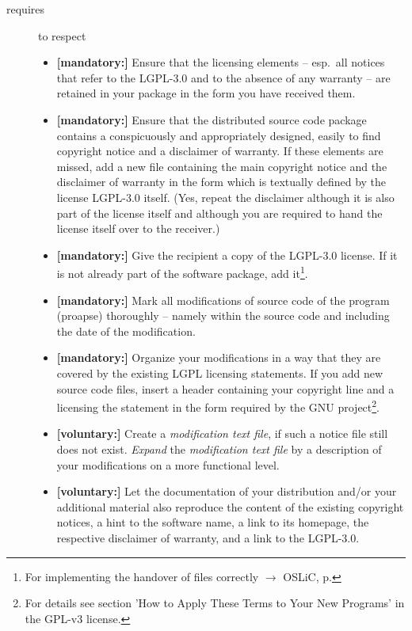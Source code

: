 \begin{description}
\item[requires] to respect
\begin{itemize}
  
  \item \textbf{[mandatory:]} Ensure that the licensing elements -- esp.\ all
  notices that refer to the LGPL-3.0 and to the absence of any
  warranty -- are retained in your package in the form you have received them.

  \item \textbf{[mandatory:]} Ensure that the distributed source code package
  contains a conspicuously and appropriately designed, easily to find copyright
  notice and a disclaimer of warranty. If these elements are missed, add a new
  file containing the main copyright notice and the disclaimer of warranty in the
  form which is textually defined by the license LGPL-3.0 itself. (Yes, repeat
  the disclaimer although it is also part of the license itself and although you
  are required to hand the license itself over to the receiver.)
  
  \item \textbf{[mandatory:]} Give the recipient a copy of the LGPL-3.0 license.
  If it is not already part of the software package, add it\footnote{For
  implementing the handover of files correctly $\rightarrow$ OSLiC, p.
  \pageref{DistributingFilesHint}}.

  \item \textbf{[mandatory:]} Mark all modifications of source code of the
  program (proapse) thoroughly -- namely within the source code and including
  the date of the modification.
  
  \item \textbf{[mandatory:]} Organize your modifications in a way that they are
  covered by the existing LGPL licensing statements. If you add new source code
  files, insert a header containing your copyright line and a licensing the
  statement in the form required by the GNU project\footnote{For details see
  section 'How to Apply These Terms to Your New Programs' in the GPL-v3
  license.}.
  
  \item \textbf{[voluntary:]} Create a \emph{modification text file}, if such a
  notice file still does not exist. \emph{Expand} the \emph{modification text
  file} by a description of your modifications on a more functional level.
    
  \item \textbf{[voluntary:]} Let the documentation of your distribution and/or
  your additional material also reproduce the content of the existing
  copyright notices, a hint to the software name, a link to its homepage,
  the respective disclaimer of warranty, and a link to the LGPL-3.0.
  

\end{itemize}
\end{description}
